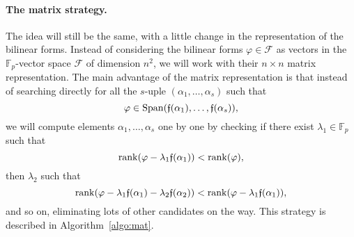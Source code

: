 \documentclass[a4paper,11pt]{article}
\begin{document}
\paragraph{The matrix strategy.}
The idea will still be the same, with a little change in the representation of
the bilinear forms. Instead of considering the bilinear forms
$\varphi\in\mathcal F$ as vectors in the $\mathbb{F}_{p}$-vector
space $\mathcal F$ of dimension $n^2$, we will work with their $n\times n$ matrix
representation. The main advantage of the matrix representation is that instead
of searching directly for all the $s$-uple $(\alpha_1, \dots, \alpha_s)$ such
that
\[
  \varphi\in\operatorname{Span}(\mathfrak{f}(\alpha_1), \dots, \mathfrak{f}(\alpha_s)),
\]
we will compute elements $\alpha_1, \dots, \alpha_s$ one by one by checking if
there exist $\lambda_1\in\mathbb{F}_p$ such that
\[
  \operatorname{rank}(\varphi-\lambda_1\mathfrak{f}(\alpha_1))<\operatorname{rank}(\varphi),
\]
then $\lambda_2$ such that
\[
  \operatorname{rank}(\varphi-\lambda_1\mathfrak{f}(\alpha_1)-\lambda_2\mathfrak{f}(\alpha_2))<\operatorname{rank}(\varphi-\lambda_1\mathfrak{f}(\alpha_1)),
\]
and so on, eliminating lots of other candidates on the way. This strategy
is described in Algorithm~\ref{algo:mat}.
\end{document}
